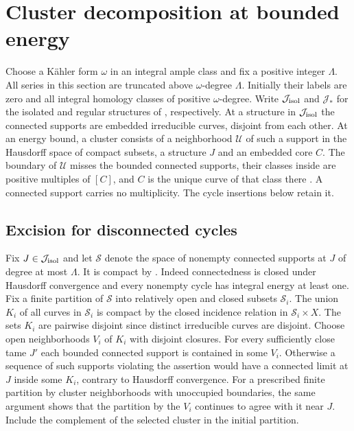 \section{Cluster decomposition at bounded energy}\label{sec:clusters}

Choose a Kähler form $\omega$ in an integral ample class and fix a positive
integer $\Lambda$. All series in this section are truncated above
$\omega$-degree $\Lambda$. Initially their labels are zero and all integral
homology classes of positive $\omega$-degree. Write $\mathcal J_{\rm isol}$
and $\mathcal J_*$ for the isolated and regular structures of
\cite[Definition~3.13]{DIW}, respectively. At a structure in
$\mathcal J_{\rm isol}$ the connected supports are embedded irreducible
curves, disjoint from each other. At an energy bound, a cluster consists
of a neighborhood $\mathcal U$ of such a support in the Hausdorff space
of compact subsets, a structure $J$ and an embedded core $C$. The
boundary of $\mathcal U$ misses the bounded connected supports, their
classes inside are positive multiples of $[C]$, and $C$ is the unique
curve of that class there \cite[Definition~3.9]{DIW}. A connected
support carries no multiplicity. The cycle insertions below retain it.

\subsection{Excision for disconnected cycles}
Fix $J\in\mathcal J_{\rm isol}$ and let $\mathscr S$ denote the space of nonempty connected supports at $J$
of degree at most $\Lambda$. It is compact by
\cite[Theorem~2.11 and Lemma~3.16]{DIW}. Indeed connectedness is closed
under Hausdorff convergence and every nonempty cycle has integral energy
at least one. Fix a finite partition of $\mathscr S$ into relatively open
and closed subsets $\mathscr S_i$. The union $K_i$ of all curves in
$\mathscr S_i$ is compact by the closed incidence relation in
$\mathscr S_i\times X$. The sets $K_i$ are pairwise disjoint since distinct
irreducible curves are disjoint. Choose open neighborhoods $V_i$ of $K_i$
with disjoint closures. For every sufficiently close tame $J'$ each
bounded connected support is contained in some $V_i$. Otherwise a
sequence of such supports violating the assertion would have a connected
limit at $J$ inside some $K_i$, contrary to Hausdorff convergence. For
a prescribed finite partition by cluster neighborhoods with unoccupied
boundaries, the same argument shows that the partition by the $V_i$
continues to agree with it near $J$. Include the complement of the
selected cluster in the initial partition.

